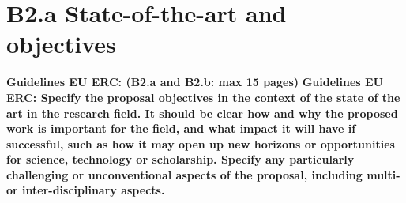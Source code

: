 \documentclass[11pt]{report}
\newcommand{\eu}[1]{{\color{teal}\textbf{Guidelines EU ERC: #1}}}
\begin{document}
%









\newpage
\newrefsection
\chapter{B2.a State-of-the-art and objectives}

\eu{(B2.a and B2.b: max 15 pages)}
\eu{Specify the proposal objectives in the context of the state
of the art in the research field. It should be clear how and why the proposed work is important for
the field, and what impact it will have if successful, such as how it may open up new horizons or
opportunities for science, technology or scholarship. Specify any particularly challenging or
unconventional aspects of the proposal, including multi- or inter-disciplinary aspects.}
\end{document}
